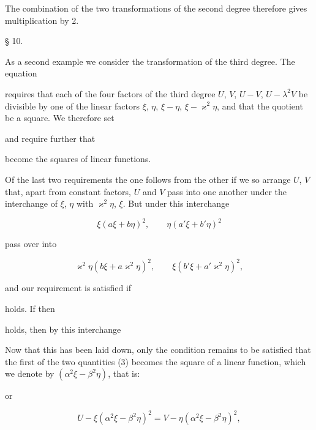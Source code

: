 The combination of the two transformations of the second degree therefore
gives multiplication by 2.

\begin{center}
§ 10. 
\end{center}

As a second example we consider the transformation of the third degree.
The equation


requires that each of the four factors of the third degree $U$, $V$,
$U-V$, $U-\lambda^2V$ be divisible by one of the linear factors $\xi$,
$\eta$, $\xi-\eta$, $\xi-\varkappa^2\eta$, and that the quotient be a square.
We therefore set


and require further that


become the squares of linear functions.

Of the last two requirements the one follows from the other if we so
arrange $U$, $V$ that, apart from constant factors, $U$ and $V$ pass into
one another under the interchange of $\xi$, $\eta$ with $\varkappa^2\eta$,
$\xi$. But under this interchange

\[
\xi(a\xi+b\eta)^2, \qquad \eta(a'\xi+b'\eta)^2
\]

pass over into

\[
\varkappa^2\eta(b\xi+a\varkappa^2\eta)^2, \qquad \xi(b'\xi+a'\varkappa^2\eta)^2,
\]

and our requirement is satisfied if


holds. If then


holds, then by this interchange


Now that this has been laid down, only the condition remains to be
satisfied that the first of the two quantities (3) becomes the square of a
linear function, which we denote by $(\alpha^2\xi-\beta^2\eta)$, that is:


or

\[
U-\xi(\alpha^2\xi-\beta^2\eta)^2 = V-\eta(\alpha^2\xi-\beta^2\eta)^2,
\]
